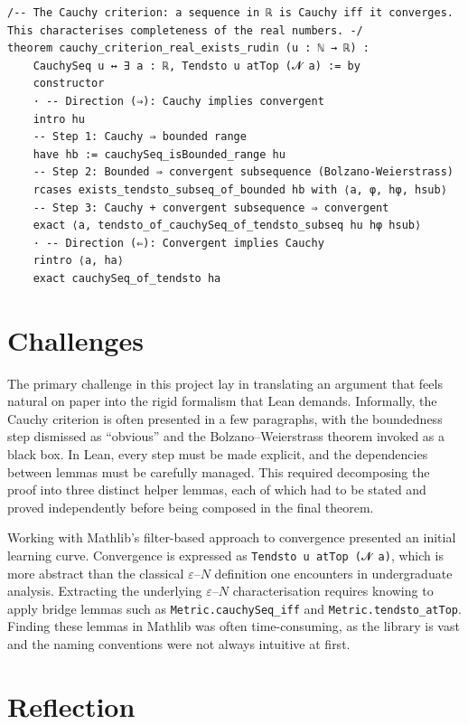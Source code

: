 \documentclass[11pt]{article}
\begin{document}
\begin{verbatim}
/-- The Cauchy criterion: a sequence in ℝ is Cauchy iff it converges.
This characterises completeness of the real numbers. -/
theorem cauchy_criterion_real_exists_rudin (u : ℕ → ℝ) :
    CauchySeq u ↔ ∃ a : ℝ, Tendsto u atTop (𝓝 a) := by
    constructor
    · -- Direction (⇒): Cauchy implies convergent
    intro hu
    -- Step 1: Cauchy ⇒ bounded range
    have hb := cauchySeq_isBounded_range hu
    -- Step 2: Bounded ⇒ convergent subsequence (Bolzano-Weierstrass)
    rcases exists_tendsto_subseq_of_bounded hb with ⟨a, φ, hφ, hsub⟩
    -- Step 3: Cauchy + convergent subsequence ⇒ convergent
    exact ⟨a, tendsto_of_cauchySeq_of_tendsto_subseq hu hφ hsub⟩
    · -- Direction (⇐): Convergent implies Cauchy
    rintro ⟨a, ha⟩
    exact cauchySeq_of_tendsto ha
\end{verbatim}

\section{Challenges}

The primary challenge in this project lay in translating an argument that feels natural on paper into the rigid formalism that Lean demands. Informally, the Cauchy criterion is often presented in a few paragraphs, with the boundedness step dismissed as ``obvious'' and the Bolzano--Weierstrass theorem invoked as a black box. In Lean, every step must be made explicit, and the dependencies between lemmas must be carefully managed. This required decomposing the proof into three distinct helper lemmas, each of which had to be stated and proved independently before being composed in the final theorem.

Working with Mathlib's filter-based approach to convergence presented an initial learning curve. Convergence is expressed as \texttt{Tendsto u atTop (𝓝 a)}, which is more abstract than the classical \(\varepsilon\)--\(N\) definition one encounters in undergraduate analysis. Extracting the underlying \(\varepsilon\)--\(N\) characterisation requires knowing to apply bridge lemmas such as \texttt{Metric.cauchySeq_iff} and \texttt{Metric.tendsto_atTop}. Finding these lemmas in Mathlib was often time-consuming, as the library is vast and the naming conventions were not always intuitive at first.

\section{Reflection}
\end{document}

